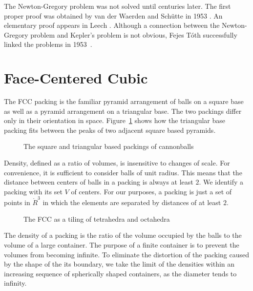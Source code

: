 The Newton-Gregory problem was not solved until centuries later.
The first proper proof was obtained by van der Waerden and
Sch\"utte in 1953 \cite{Sch53}.  An elementary proof appears in Leech
\cite{Leech:1956:MG}.  Although a connection between the Newton-Gregory
problem and Kepler's problem is not obvious, Fejes T\'oth successfully linked the
problems in 1953~\cite{Fej53}.


\section{Face-Centered Cubic}



The FCC packing is the familiar pyramid arrangement of
balls on a square base as well as a pyramid arrangement on a
triangular base.  The two packings
differ only in their orientation in space.
Figure~\ref{fig:tri-square-cannonballs} shows how the triangular base
packing fits between the peaks of two adjacent square based pyramids.

\begin{figure}[htb]
  \centering
  \caption{The square and triangular based packings of cannonballs}
  \label{fig:tri-square-cannonballs}
\end{figure}

Density, defined as a ratio of volumes, is insensitive to changes of
scale.  For convenience, it is sufficient to consider balls of unit
radius. This means that the distance between centers of balls in a
packing is always  at least $2$.  We identify a packing with its set $V$
of centers.   For our purposes, a packing is just a set of points
in $\ring{R}^3$ in which the elements are separated by distances of at least
$2$.


\begin{figure}[htb]
  \centering
  \caption{The FCC as a tiling of tetrahedra and octahedra}
  \label{fig:tet-oct}
\end{figure}

The density of a packing is the ratio of the volume occupied by the
balls to the volume of a large container.  The
purpose of a finite container is to prevent the volumes from becoming
infinite.  To eliminate the distortion of the packing caused by the
shape of the its boundary, we take the limit of the densities within an increasing
sequence of spherically shaped containers, as the diameter tends to infinity.

